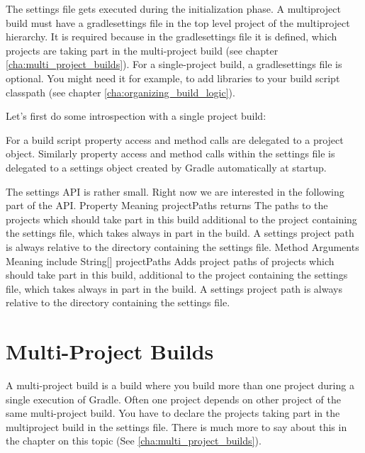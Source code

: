 The settings file gets executed during the initialization phase. A multiproject build must have a gradlesettings file in the top level project of the multiproject hierarchy. It is required because in the gradlesettings file it is defined, which projects are taking part in the multi-project build (see chapter \ref{cha:multi_project_builds}). For a single-project build, a gradlesettings file is optional. You might need it for example, to add libraries to your build script classpath (see chapter \ref{cha:organizing_build_logic}).

Let's first do some introspection with a single project build:

For a build script property access and method calls are delegated to a project object. Similarly property access and method calls within the settings file is delegated to a settings object created by Gradle automatically at startup.

The settings API is rather small. Right now we are interested in the following part of the API.
Property 	Meaning
projectPaths 	returns The paths to the projects which should take part in this build additional to the project containing the settings file, which takes always in part in the build. A settings project path is always relative to the directory containing the settings file.
Method 	Arguments 	Meaning
include 	String[] projectPaths 	Adds project paths of projects which should take part in this build, additional to the project containing the settings file, which takes always in part in the build. A settings project path is always relative to the directory containing the settings file.

\section{Multi-Project Builds} %
\label{sec:multi_project_builds}
A multi-project build is a build where you build more than one project during a single execution of Gradle. Often one project depends on other project of the same multi-project build. You have to declare the projects taking part in the multiproject build in the settings file. There is much more to say about this in the chapter on this topic (See \ref{cha:multi_project_builds}). 

